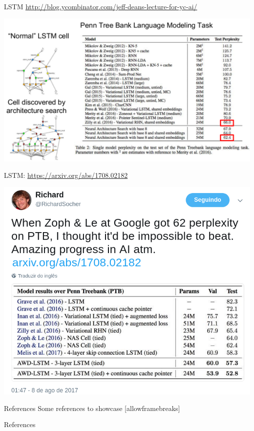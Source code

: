\documentclass[10pt]{beamer}
\begin{document}
\begin{frame}{LSTM}
\url{http://blog.ycombinator.com/jeff-deans-lecture-for-yc-ai/}

\begin{center}
\includegraphics[scale=0.45]{images/JeffDeanLectureforYCAI.pdf}
\end{center}

\end{frame}


\begin{frame}{LSTM: \url{https://arxiv.org/abs/1708.02182}}

\begin{center}
\includegraphics[scale=0.34]{images/SocherPTB.png}
\end{center}

\end{frame}


\begin{frame}{References}
  Some references to showcase [allowframebreaks] \cite{Mikolov11,DeepLearningbook}
\end{frame}


\begin{frame}[allowframebreaks]{References}

  
  

\end{frame}
\end{document}
